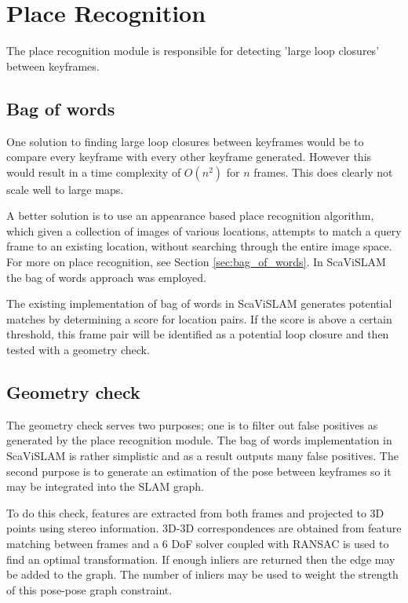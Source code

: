 \section{Place Recognition}
\label{sec:scavislam_place_recog}

The place recognition module is responsible for detecting 'large loop closures' between keyframes.

\subsection{Bag of words}

One solution to finding large loop closures between keyframes would be to compare every keyframe with every other keyframe generated.  However this would result in a time complexity of $O(n^2)$ for $n$ frames.  This does clearly not scale well to large maps.

A better solution is to use an appearance based place recognition algorithm, which given a collection of images of various locations, attempts to match a query frame to an existing location, without searching through the entire image space.  For more on place recognition, see Section \ref{sec:bag_of_words}.  In ScaViSLAM the bag of words approach was employed.

The existing implementation of bag of words in ScaViSLAM generates potential matches by determining a score for location pairs.  If the score is above a certain threshold, this frame pair will be identified as a potential loop closure and then tested with a geometry check.

\subsection{Geometry check}
\label{subsec:geometry_check}

The geometry check serves two purposes; one is to filter out false positives as generated by the place recognition module.  The bag of words implementation in ScaViSLAM is rather simplistic and as a result outputs many false positives.  The second purpose is to generate an estimation of the pose between keyframes so it may be integrated into the SLAM graph.  

To do this check, features are extracted from both frames and projected to 3D points using stereo information.  3D-3D correspondences are obtained from feature matching between frames and a 6 DoF solver coupled with RANSAC is used to find an optimal transformation.  If enough inliers are returned then the edge may be added to the graph.  The number of inliers may be used to weight the strength of this pose-pose graph constraint.

